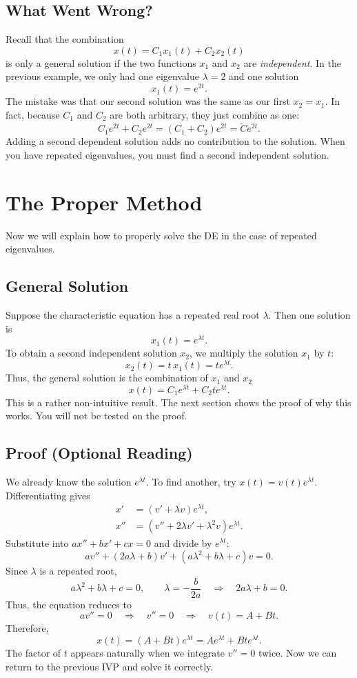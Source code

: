 \documentclass[10pt,letterpaper]{article}
\begin{document}

\subsection{What Went Wrong?}

Recall that the combination 
\[
x(t)=C_1x_1(t)+C_2x_2(t)
\]
is only a general solution if the two functions $x_1$ and $x_2$ are \textit{independent}. In the previous example, we only had one eigenvalue $\lambda=2$ and one solution
\[
x_1(t)=e^{2t}.
\]
The mistake was that our second solution was the same as our first $x_2=x_1$.
In fact, because $C_1$ and $C_2$ are both arbitrary, they just combine as one:
\[
C_1e^{2t}+C_2e^{2t}
=(C_1+C_2)e^{2t}
=\widetilde{C}e^{2t}.
\]
Adding a second dependent solution adds no contribution to the solution. When you have repeated eigenvalues, you must find a second independent solution.


\section{The Proper Method}
Now we will explain how to properly solve the DE in the case of repeated eigenvalues.

\subsection{General Solution}
Suppose the characteristic equation has a repeated real root $\lambda$.
Then one solution is
\[
x_1(t)=e^{\lambda t}.
\]
To obtain a second independent solution $x_2$, we multiply the solution $x_1$ by $t$:
\[
x_2(t)=t\,x_1(t)=te^{\lambda t}.
\]
Thus, the general solution is the combination of $x_1$ and $x_2$
\[
x(t)=C_1e^{\lambda t}+C_2te^{\lambda t}.
\]
This is a rather non-intuitive result. The next section shows the proof of why this works. You will not be tested on the proof.

\subsection{Proof (Optional Reading)}
We already know the solution $e^{\lambda t}$. To find another,
try $x(t)=v(t)e^{\lambda t}$. Differentiating gives
\begin{align*}
x'  &= (v'+\lambda v)e^{\lambda t},\\
x'' &= (v''+2\lambda v'+\lambda^2v)e^{\lambda t}.
\end{align*}
Substitute into $ax''+bx'+cx=0$ and divide by $e^{\lambda t}$:
\[
av''+(2a\lambda+b)v'+(a\lambda^2+b\lambda+c)v=0.
\]
Since $\lambda$ is a repeated root,
\[
a\lambda^2+b\lambda+c=0,
\qquad
\lambda=-\frac{b}{2a}
\quad\Rightarrow\quad
2a\lambda+b=0.
\]
Thus, the equation reduces to
\[
av''=0
\quad\Rightarrow\quad
v''=0
\quad\Rightarrow\quad
v(t)=A+Bt.
\]
Therefore,
\[
x(t)=(A+Bt)e^{\lambda t}
=Ae^{\lambda t}+Bte^{\lambda t}.
\]
The factor of $t$ appears naturally when we integrate $v''=0$ twice. Now we can return to the previous IVP and solve it correctly.
\end{document}
